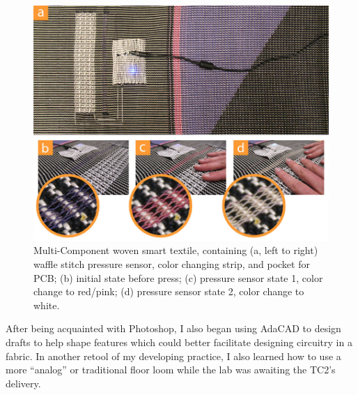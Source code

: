 \begin{figure}[h]
  \centering
  \includegraphics[width=0.6\linewidth]{figs/AdaCAD_multicomp.jpg}
  \caption[A multi-component woven e-textile.]{Multi-Component woven smart textile, containing (a, left to right) waffle stitch pressure sensor, color changing strip, and pocket for PCB; (b) initial state before press; (c) pressure sensor state 1, color change to red/pink; (d) pressure sensor state 2, color change to white.
  }
  \label{fig:multicomp-weave}
\end{figure}

After being acquainted with Photoshop, I also began using AdaCAD to design drafts to help shape features which could better facilitate designing circuitry in a fabric. In another retool of my developing practice, I also learned how to use a more ``analog'' or traditional floor loom while the lab was awaiting the TC2's delivery. 

